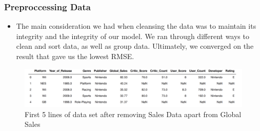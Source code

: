 \begin{frame}
    \frametitle{Preproccessing Data}
    \begin{itemize}
    \item The main consideration we had when cleansing the data was to maintain its integrity and the integrity of our model. We ran through different ways to clean and sort data, as well as group data. Ultimately, we converged on the result that gave us the lowest RMSE. 
    \end{itemize}
    \begin{figure}[H]
        \centering
        \includegraphics[scale=.6]{graphs/headdata.png}
        \caption{First 5 lines of data set after removing Sales Data apart from Global Sales}
    \end{figure}
\end{frame}
    
